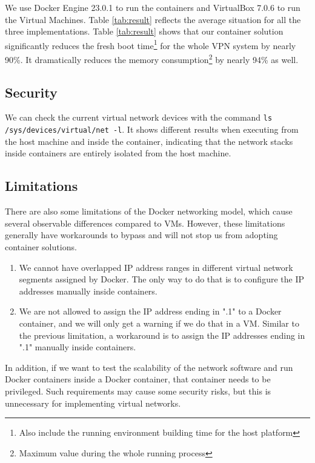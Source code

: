 \documentclass[article]{aaltoseries}
\begin{document}
We use Docker Engine 23.0.1 to run the containers and VirtualBox 7.0.6 to run the Virtual Machines. Table \ref{tab:result} reflects the average situation for all the three implementations. Table \ref{tab:result} shows that our container solution significantly reduces the fresh boot time\footnote{Also include the running environment building time for the host platform} for the whole VPN system by nearly 90\%. It dramatically reduces the memory consumption\footnote{Maximum value during the whole running process} by nearly 94\% as well.

\subsection{Security}
We can check the current virtual network devices with the command \texttt{ls /sys/devices/virtual/net -l}. It shows different results when executing from the host machine and inside the container, indicating that the network stacks inside containers are entirely isolated from the host machine.

\subsection{Limitations}

There are also some limitations of the Docker networking model, which cause several observable differences compared to VMs. However, these limitations generally have workarounds to bypass and will not stop us from adopting container solutions.

\begin{enumerate}
\setlength{\itemsep}{0pt}
\setlength{\parsep}{0pt}
\setlength{\parskip}{0pt}
\item We cannot have overlapped IP address ranges in different virtual network segments assigned by Docker. The only way to do that is to configure the IP addresses manually inside containers.
\item We are not allowed to assign the IP address ending in ".1" to a Docker container, and we will only get a warning if we do that in a VM. Similar to the previous limitation, a workaround is to assign the IP addresses ending in ".1" manually inside containers.
\end{enumerate}

In addition, if we want to test the scalability of the network software and run Docker containers inside a Docker container, that container needs to be privileged. Such requirements may cause some security risks, but this is unnecessary for implementing virtual networks.
\end{document}
